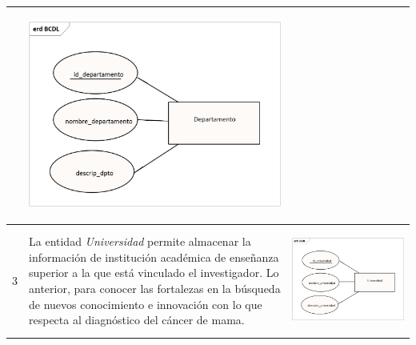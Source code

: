 \begin{table}[htb!]
\begin{threeparttable}
\begin{tabular}{p{0.5cm} p{7cm} p{7cm}}
			& \begin{center}\includegraphics[width=1\linewidth]{MER/IMAGENES_MER/2_DEPARTAMENTO}\end{center}
			\\ \hline
			3
			& La entidad \textit{Universidad} permite almacenar la información de institución académica de enseñanza superior a la que está vinculado el investigador. Lo anterior, para conocer las fortalezas en la búsqueda de nuevos conocimiento e innovación con lo que respecta al diagnóstico del cáncer de mama.
			& \begin{center}\includegraphics[width=1\linewidth]{MER/IMAGENES_MER/3_UNIVERSIDAD}\end{center}

\end{tabular}
\end{threeparttable}
\end{table}
